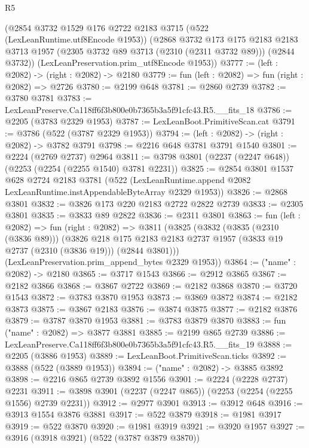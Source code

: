 \begin{lexlean}{R5}
\begin{coremodule}
    (@2854
      @3732
      @1529
      @176
      @2722
      @2183
      @3715
      (@522 (LexLeanRuntime.utf8Encode @1953))
      (@2868
        @3732
        @173
        @175
        @2183
        @2183
        @3713
        @1957
        (@2305 @3732 @89 @3713 (@2310 (@2311 @3732 @89)))
        (@2844 @3732))
      (LexLeanPreservation.prim_utf8Encode @1953))
@3777 := (left : @2082) -> (right : @2082) -> @2180
@3779 := fun (left : @2082) => fun (right : @2082) => @2726
@3780 := @2199 @648
@3781 := @2860 @2739
@3782 := @3780 @3781
@3783 := LexLeanPreserve.Ca118ff6f3b800e0b7365b3a5f91cfc43.R5.__fits_18
@3786 := @2205 (@3783 @2329 @1953)
@3787 := LexLeanBoot.PrimitiveScan.cat
@3791 := @3786 (@522 (@3787 @2329 @1953))
@3794 := (left : @2082) -> (right : @2082) -> @3782 @3791
@3798 := @2216 @648 @3781 @3791 @1540
@3801 := @2224 (@2769 @2737) @2964
@3811 := @3798 @3801 (@2237 (@2247 @648)) (@2253 (@2254 (@2255 @1540) @3781 @2231))
@3825 := @2854
    @3801
    @1537
    @628
    @2724
    @2183
    @3781
    (@522 (LexLeanRuntime.append @2082 LexLeanRuntime.instAppendableByteArray @2329 @1953))
@3826 := @2868 @3801
@3832 := @3826 @173 @220 @2183 @2722 @2822 @2739
@3833 := @2305 @3801
@3835 := @3833 @89 @2822
@3836 := @2311 @3801
@3863 := fun (left : @2082) =>
  fun (right : @2082) =>
  @3811
    (@3825
      (@3832
        (@3835 (@2310 (@3836 @89)))
        (@3826
          @218
          @175
          @2183
          @2183
          @2737
          @1957
          (@3833 @19 @2737 (@2310 (@3836 @19)))
          (@2844 @3801)))
      (LexLeanPreservation.prim_append_bytes @2329 @1953))
@3864 := ("name" : @2082) -> @2180
@3865 := @3717 @1543
@3866 := @2912 @3865
@3867 := @2182 @3866
@3868 := @3867 @2722
@3869 := @2182 @3868
@3870 := @3720 @1543
@3872 := @3783 @3870 @1953
@3873 := @3869 @3872
@3874 := @2182 @3873
@3875 := @3867 @2183
@3876 := @3874 @3875
@3877 := @2182 @3876
@3879 := @3787 @3870 @1953
@3881 := @3783 @3879 @3870
@3883 := fun ("name" : @2082) => @3877 @3881
@3885 := @2199 @865 @2739
@3886 := LexLeanPreserve.Ca118ff6f3b800e0b7365b3a5f91cfc43.R5.__fits_19
@3888 := @2205 (@3886 @1953)
@3889 := LexLeanBoot.PrimitiveScan.ticks
@3892 := @3888 (@522 (@3889 @1953))
@3894 := ("name" : @2082) -> @3885 @3892
@3898 := @2216 @865 @2739 @3892 @1556
@3901 := @2224 (@2228 @2737) @2231
@3911 := @3898 @3901 (@2237 (@2247 @865)) (@2253 (@2254 (@2255 @1556) @2739 @2231))
@3912 := @2977 @3901
@3913 := @3912 @648
@3916 := @3913 @1554 @3876 @3881
@3917 := @522 @3879
@3918 := @1981 @3917
@3919 := @522 @3870
@3920 := @1981 @3919
@3921 := @3920 @1957
@3927 := @3916 (@3918 @3921) (@522 (@3787 @3879 @3870))

\end{coremodule}
\end{lexlean}
